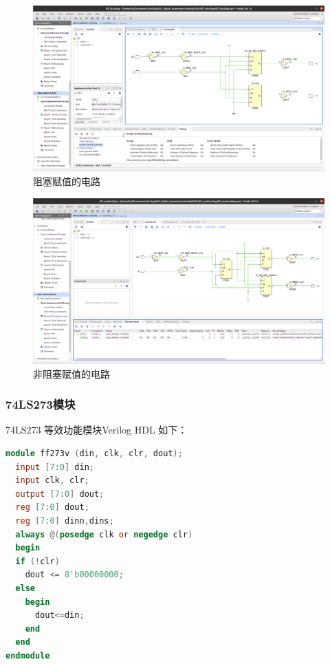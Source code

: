 \documentclass[11pt]{SEU-Digital-Report}
\begin{document}
    \begin{figure}[htbp]
      \centering
      \includegraphics[width=\linewidth]{fig/vivado/dff_blocking.png}
      \caption{阻塞赋值的电路}
      \label{fig:vivado:blocking}
    \end{figure}
    \begin{figure}[htbp]
      \centering
      \includegraphics[width=\linewidth]{fig/vivado/dff_nonblocking.png}
      \caption{非阻塞赋值的电路}
      \label{fig:vivado:nonblocking}
    \end{figure}

    \subsubsection{74LS273模块}
      74LS273 等效功能模块Verilog HDL 如下：
          \begin{lstlisting}[language=verilog, title=74LS273, numbers=none]
module ff273v (din, clk, clr, dout);
  input [7:0] din;
  input clk, clr;
  output [7:0] dout;
  reg [7:0] dout;
  reg [7:0] dinn,dins;
  always @(posedge clk or negedge clr)
  begin
  if (!clr)
    dout <= 8'b00000000;
  else
    begin
      dout<=din;
    end
  end
endmodule
      \end{lstlisting}
\end{document}
